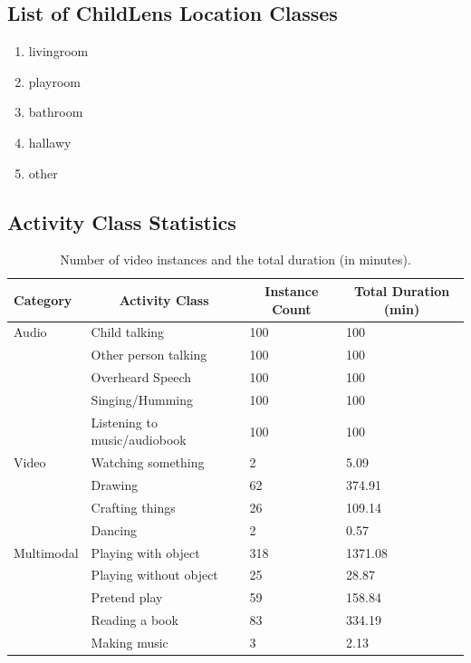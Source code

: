 \documentclass[
  man,floatsintext]{apa6}
\providecommand{\tightlist}{%
  \setlength{\itemsep}{0pt}\setlength{\parskip}{0pt}}
\begin{document}
\subsection{List of ChildLens Location Classes}\label{list-of-childlens-location-classes}

\begin{enumerate}
\def\labelenumi{\arabic{enumi}.}
\tightlist
\item
  livingroom
\item
  playroom
\item
  bathroom
\item
  hallawy
\item
  other
\end{enumerate}

\subsection{Activity Class Statistics}\label{activity-class-statistics}

\begin{table}[tbp]

\begin{center}
\begin{threeparttable}

\caption{\label{tab:activity-classes-statistics}Number of video instances and the total duration (in minutes).}

\begin{tabular}{llll}
\toprule
Category & \multicolumn{1}{c}{Activity Class} & \multicolumn{1}{c}{Instance Count} & \multicolumn{1}{c}{Total Duration (min)}\\
\midrule
Audio & Child talking & 100 & 100\\
 & Other person talking & 100 & 100\\
 & Overheard Speech & 100 & 100\\
 & Singing/Humming & 100 & 100\\
 & Listening to music/audiobook & 100 & 100\\
Video & Watching something & 2 & 5.09\\
 & Drawing & 62 & 374.91\\
 & Crafting things & 26 & 109.14\\
 & Dancing & 2 & 0.57\\
Multimodal & Playing with object & 318 & 1371.08\\
 & Playing without object & 25 & 28.87\\
 & Pretend play & 59 & 158.84\\
 & Reading a book & 83 & 334.19\\
 & Making music & 3 & 2.13\\
\bottomrule
\end{tabular}

\end{threeparttable}
\end{center}

\end{table}
\end{document}
